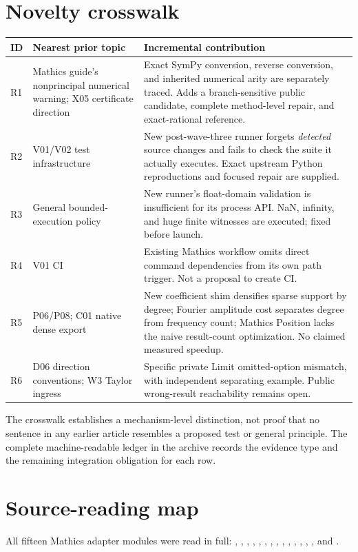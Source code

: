 \documentclass[11pt,a4paper]{article}
\begin{document}
\section{Novelty crosswalk}
\begin{longtable}{@{}L{0.075\textwidth}L{0.22\textwidth}L{0.615\textwidth}@{}}
\toprule
ID & Nearest prior topic & Incremental contribution\\
\midrule
\endhead
R1 & Mathics guide's nonprincipal numerical warning; X05 certificate direction & Exact SymPy conversion, reverse conversion, and inherited numerical arity are separately traced. Adds a branch-sensitive public candidate, complete method-level repair, and exact-rational reference.\\
R2 & V01/V02 test infrastructure & New post-wave-three runner forgets \emph{detected} source changes and fails to check the suite it actually executes. Exact upstream Python reproductions and focused repair are supplied.\\
R3 & General bounded-execution policy & New runner's float-domain validation is insufficient for its process API. NaN, infinity, and huge finite witnesses are executed; fixed before launch.\\
R4 & V01 CI & Existing Mathics workflow omits direct command dependencies from its own path trigger. Not a proposal to create CI.\\
R5 & P06/P08; C01 native dense export & New coefficient shim densifies sparse support by degree; Fourier amplitude cost separates degree from frequency count; Mathics Position lacks the naive result-count optimization. No claimed measured speedup.\\
R6 & D06 direction conventions; W3 Taylor ingress & Specific private Limit omitted-option mismatch, with independent separating example. Public wrong-result reachability remains open.\\
\bottomrule
\end{longtable}
The crosswalk establishes a mechanism-level distinction, not proof that no sentence in any earlier article resembles a proposed test or general principle. The complete machine-readable ledger in the archive records the evidence type and the remaining integration obligation for each row.

\section{Source-reading map}
All fifteen Mathics adapter modules were read in full: , , , , , , , , , , , , , , and .
\end{document}

